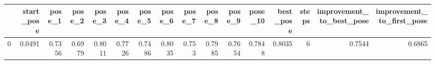\begin{tabular}{lrrrrrrrrrrrrrrr}
\toprule
{} &  start\_pose &  pose\_1 &  pose\_2 &  pose\_3 &  pose\_4 &  pose\_5 &  pose\_6 &  pose\_7 &  pose\_8 &  pose\_9 &  pose\_10 &  best\_pose &  steps &  improvement\_to\_best\_pose &  improvement\_to\_first\_pose \\
\midrule
0 &      0.0491 &  0.7356 &  0.6979 &  0.8011 &  0.7726 &  0.7486 &  0.8035 &   0.753 &  0.7985 &  0.7654 &   0.7848 &     0.8035 &      6 &                    0.7544 &                     0.6865 \\
\bottomrule
\end{tabular}
